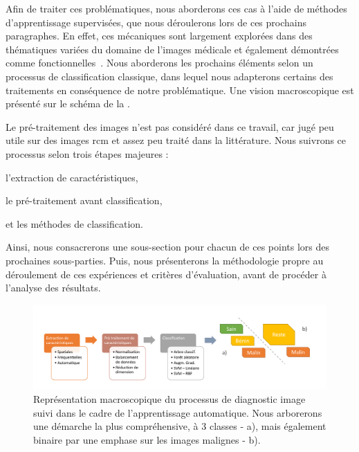 Afin de traiter ces problématiques, nous aborderons ces cas à l'aide de méthodes d'apprentissage supervisées, que nous déroulerons lors de ces prochains paragraphes. En effet, ces mécaniques sont largement explorées dans des thématiques variées du domaine de l'images médicale et également démontrées comme fonctionnelles~\cite{Litjens2017,Pathan2018}. Nous aborderons les prochains éléments selon un processus de classification classique, dans lequel nous adapterons certains des traitements en conséquence de notre problématique. Une vision macroscopique est présenté sur le schéma de la .\par

Le pré-traitement des images n'est pas considéré dans ce travail, car jugé peu utile sur des images \gls{rcm} et assez peu traité dans la littérature. Nous suivrons ce processus selon trois étapes majeures :
\begin{inlinerate}
    \item l'extraction de caractéristiques,
    \item le pré-traitement avant classification,
    \item et les méthodes de classification.
\end{inlinerate}
Ainsi, nous consacrerons une sous-section pour chacun de ces points lors des prochaines sous-parties. Puis, nous présenterons la méthodologie propre au déroulement de ces expériences et critères d'évaluation, avant de procéder à l'analyse des résultats.\par

\begin{figure}[H]
\centering
    \includegraphics[width=\linewidth]{contents/chapter_4/resources/scheme_macro_image_classification.pdf}
    \caption{Représentation macroscopique du processus de diagnostic image suivi dans le cadre de l'apprentissage automatique. Nous arborerons une démarche la plus compréhensive, à 3 classes - a), mais également binaire par une emphase sur les images malignes - b).}
    \label{fig:scheme_macro_image_classification}
\end{figure}\par

